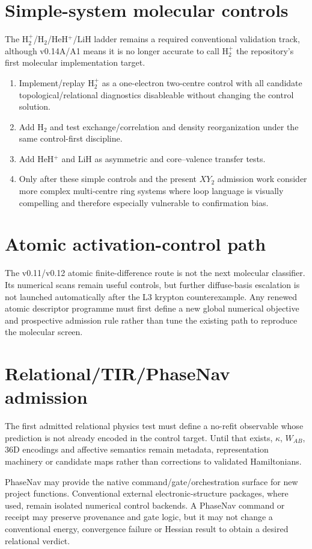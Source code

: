 \section{Simple-system molecular controls}
The H$_2^+$/H$_2$/HeH$^+$/LiH ladder remains a required conventional validation track, although v0.14A/A1 means it is no longer accurate to call H$_2^+$ the repository's first molecular implementation target.

\begin{enumerate}
\item Implement/replay H$_2^+$ as a one-electron two-centre control with all candidate topological/relational diagnostics disableable without changing the control solution.
\item Add H$_2$ and test exchange/correlation and density reorganization under the same control-first discipline.
\item Add HeH$^+$ and LiH as asymmetric and core--valence transfer tests.
\item Only after these simple controls and the present $XY_2$ admission work consider more complex multi-centre ring systems where loop language is visually compelling and therefore especially vulnerable to confirmation bias.
\end{enumerate}

\section{Atomic activation-control path}
The v0.11/v0.12 atomic finite-difference route is not the next molecular classifier.  Its numerical scans remain useful controls, but further diffuse-basis escalation is not launched automatically after the L3 krypton counterexample.  Any renewed atomic descriptor programme must first define a new global numerical objective and prospective admission rule rather than tune the existing path to reproduce the molecular screen.

\section{Relational/TIR/PhaseNav admission}
The first admitted relational physics test must define a no-refit observable whose prediction is not already encoded in the control target.  Until that exists, $\kappa$, $W_{AB}$, 36D encodings and affective semantics remain metadata, representation machinery or candidate maps rather than corrections to validated Hamiltonians.

PhaseNav may provide the native command/gate/orchestration surface for new project functions.  Conventional external electronic-structure packages, where used, remain isolated numerical control backends.  A PhaseNav command or receipt may preserve provenance and gate logic, but it may not change a conventional energy, convergence failure or Hessian result to obtain a desired relational verdict.

